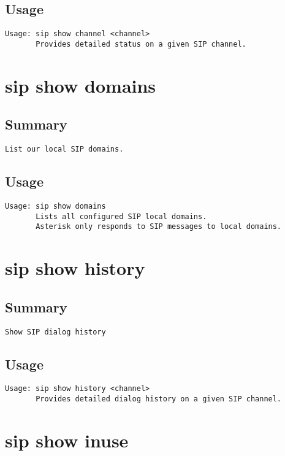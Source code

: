 \subsection{Usage}
\begin{verbatim}
Usage: sip show channel <channel>
       Provides detailed status on a given SIP channel.

\end{verbatim}


\section{sip show domains}
\subsection{Summary}
\begin{verbatim}
List our local SIP domains.
\end{verbatim}
\subsection{Usage}
\begin{verbatim}
Usage: sip show domains
       Lists all configured SIP local domains.
       Asterisk only responds to SIP messages to local domains.

\end{verbatim}


\section{sip show history}
\subsection{Summary}
\begin{verbatim}
Show SIP dialog history
\end{verbatim}
\subsection{Usage}
\begin{verbatim}
Usage: sip show history <channel>
       Provides detailed dialog history on a given SIP channel.

\end{verbatim}


\section{sip show inuse}
